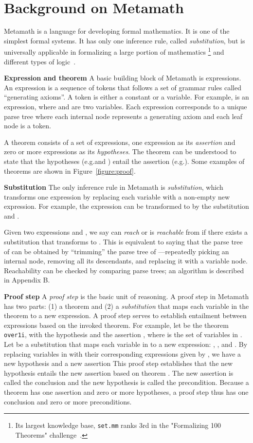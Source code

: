 \documentclass{article}
\begin{document}
\section{Background on Metamath}
\label{sec:metamath}

Metamath is a language for developing formal mathematics. 
It is one of the simplest formal systems. It has only one inference rule, called \emph{substitution},
but is universally applicable in formalizing a large portion of mathematics
\footnote{Its largest knowledge base, \texttt{set.mm} ranks 3rd 
in the "Formalizing 100 Theorems" challenge~\citep{formalize100}.}
and different types of logic~\citep{metamath}.


\noindent\textbf{Expression and theorem}
A basic building block of Metamath is expressions. An expression is 
a sequence of tokens that follows a set of grammar rules called ``generating axioms''. 
A token is either a constant or a variable.  For example, 
 is an expression, where  and  are two variables.  Each expression corresponds to a unique parse tree where each internal node represents a generating axiom and each leaf node is a token.  

A theorem consists of a set of expressions, one expression as its \emph{assertion} and zero or more expressions as its \emph{hypotheses}. 
The theorem can be understood to state that the hypotheses (e.g.\@  and ) 
entail the assertion (e.g.\@ ).
Some examples of theorems are shown in Figure~\ref{figure:proof}.

\noindent\textbf{Substitution}
The only inference rule in Metamath is \emph{substitution}, which transforms one expression by replacing each variable with a non-empty new expression. For example, the expression  can be transformed to  by the substitution  and . 

Given two expressions  and , we say  can \emph{reach}  or  is \emph{reachable} from  if there exists a substitution that transforms  to . This is equivalent to saying that the parse tree of  can be obtained by ``trimming'' the parse tree of ---repeatedly picking an internal node, removing all its descendants, and replacing it with a variable node. Reachability can be checked by comparing parse trees; an algorithm is described in Appendix B. 

\noindent\textbf{Proof step}
A \emph{proof step} is the basic unit of reasoning. 
A proof step in Metamath has two parts: (1) a theorem and (2) a \emph{substitution} that maps each variable in the theorem to a new expression. 
A proof step serves to establish entailment between expressions based on the invoked theorem. 
 For example, let  be the theorem \texttt{over1i}, 
 with the hypothesis  and the assertion ,
where  is the set of variables in .
Let  be a substitution that maps each variable in  to  a new expression:
, ,  and .
By replacing variables in  with their corresponding expressions given by ,
we have a new hypothesis  and a new assertion 
This proof step  establishes that  the new hypothesis  entails the new assertion  based on theorem . 
The new assertion is called the conclusion
and the new hypothesis is called the precondition.
Because a theorem has one assertion and zero or more hypotheses, a proof step thus has one conclusion and zero or more preconditions. 
\end{document}
